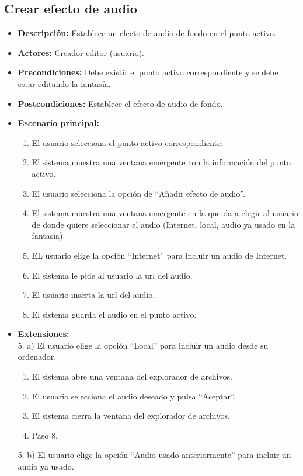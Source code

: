 \documentclass[12pt,letterpaper]{article}
\begin{document}
\subsection{Crear efecto de audio}
\begin{itemize}
	\item \textbf{Descripción:} Establece un efecto de audio de fondo en el punto activo.
	\item \textbf{Actores:} Creador-editor (usuario).
	\item \textbf{Precondiciones:} Debe existir el punto activo correspondiente y se debe estar editando la fantasía.
	\item \textbf{Postcondiciones:} Establece el efecto de audio de fondo.
	\item \textbf{Escenario principal:}
	\begin{enumerate}
		\item El usuario selecciona el punto activo correspondiente.
		\item El sistema muestra una ventana emergente con la información del punto activo.
		\item El usuario selecciona la opción de ``Añadir efecto de audio''.
		\item El sistema muestra una ventana emergente en la que da a elegir al usuario de donde quiere seleccionar el audio (Internet, local, audio ya usado en la fantasía).
		\item EL usuario elige la opción ``Internet'' para incluir un audio de Internet.
		\item El sistema le pide al usuario la url del audio.
		\item El usuario inserta la url del audio.
		\item El sistema guarda el audio en el punto activo.
	\end{enumerate}
	\item \textbf{Extensiones:} \\ 5. a) El usuario elige la opción ``Local'' para incluir un audio desde su ordenador.
	\begin{enumerate}
		\item El sistema abre una ventana del explorador de archivos.
		\item El usuario selecciona el audio deseado y pulsa ``Aceptar''.
		\item El sistema cierra la ventana del explorador de archivos.
		\item Paso 8.
	\end{enumerate}
	5. b) El usuario elige la opción ``Audio usado anteriormente'' para incluir un audio ya usado.

\end{itemize}
\end{document}

